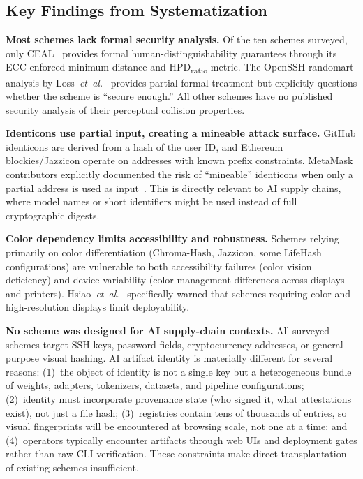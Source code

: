 \documentclass[conference,10pt]{IEEEtran}
\newcommand{\etal}{\textit{et~al.}}
\begin{document}
\subsection{Key Findings from Systematization}

\noindent\textbf{Most schemes lack formal security analysis.}
Of the ten schemes surveyed, only CEAL~\cite{azimpourkivi2020human} provides formal human-distinguishability guarantees through its ECC-enforced minimum distance and HPD\textsubscript{ratio} metric.
The OpenSSH randomart analysis by Loss~\etal~\cite{loss2009drunken} provides partial formal treatment but explicitly questions whether the scheme is ``secure enough.''
All other schemes have no published security analysis of their perceptual collision properties.

\noindent\textbf{Identicons use partial input, creating a mineable attack surface.}
GitHub identicons are derived from a hash of the user ID, and Ethereum blockies/Jazzicon operate on addresses with known prefix constraints.
MetaMask contributors explicitly documented the risk of ``mineable'' identicons when only a partial address is used as input~\cite{metamask2016identicon}.
This is directly relevant to AI supply chains, where model names or short identifiers might be used instead of full cryptographic digests.

\noindent\textbf{Color dependency limits accessibility and robustness.}
Schemes relying primarily on color differentiation (Chroma-Hash, Jazzicon, some LifeHash configurations) are vulnerable to both accessibility failures (color vision deficiency) and device variability (color management differences across displays and printers).
Hsiao~\etal~\cite{hsiao2009study} specifically warned that schemes requiring color and high-resolution displays limit deployability.

\noindent\textbf{No scheme was designed for AI supply-chain contexts.}
All surveyed schemes target SSH keys, password fields, cryptocurrency addresses, or general-purpose visual hashing.
AI artifact identity is materially different for several reasons: (1)~the object of identity is not a single key but a heterogeneous bundle of weights, adapters, tokenizers, datasets, and pipeline configurations; (2)~identity must incorporate provenance state (who signed it, what attestations exist), not just a file hash; (3)~registries contain tens of thousands of entries, so visual fingerprints will be encountered at browsing scale, not one at a time; and (4)~operators typically encounter artifacts through web UIs and deployment gates rather than raw CLI verification.
These constraints make direct transplantation of existing schemes insufficient.
\end{document}
